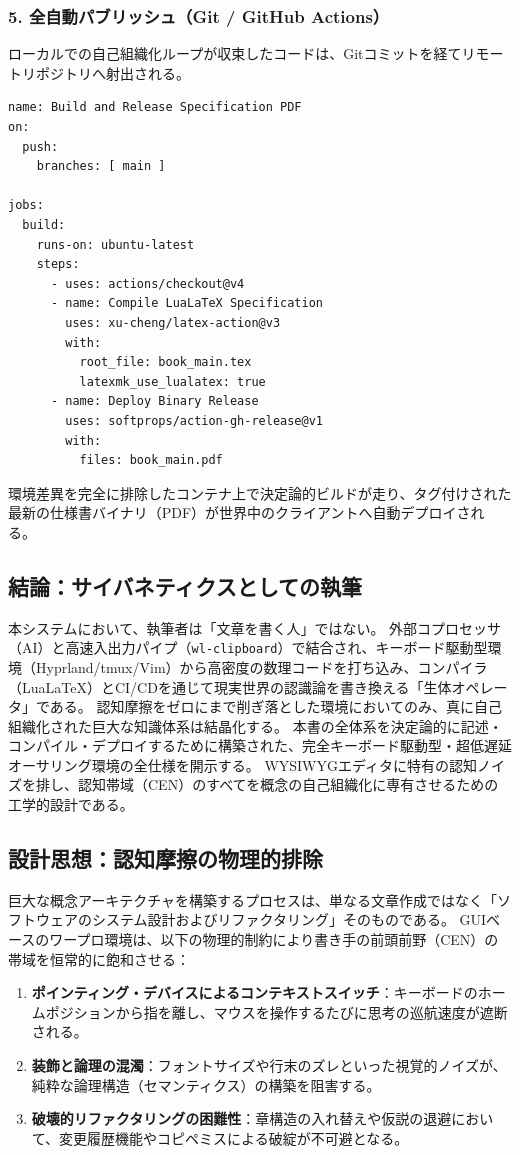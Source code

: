 \subsubsection{5. 全自動パブリッシュ（Git / GitHub Actions）}
ローカルでの自己組織化ループが収束したコードは、Gitコミットを経てリモートリポジトリへ射出される。

\begin{verbatim}
name: Build and Release Specification PDF
on:
  push:
    branches: [ main ]

jobs:
  build:
    runs-on: ubuntu-latest
    steps:
      - uses: actions/checkout@v4
      - name: Compile LuaLaTeX Specification
        uses: xu-cheng/latex-action@v3
        with:
          root_file: book_main.tex
          latexmk_use_lualatex: true
      - name: Deploy Binary Release
        uses: softprops/action-gh-release@v1
        with:
          files: book_main.pdf
\end{verbatim}

環境差異を完全に排除したコンテナ上で決定論的ビルドが走り、タグ付けされた最新の仕様書バイナリ（PDF）が世界中のクライアントへ自動デプロイされる。

\subsection{結論：サイバネティクスとしての執筆}
本システムにおいて、執筆者は「文章を書く人」ではない。
外部コプロセッサ（AI）と高速入出力パイプ（\texttt{wl-clipboard}）で結合され、キーボード駆動型環境（Hyprland/tmux/Vim）から高密度の数理コードを打ち込み、コンパイラ（LuaLaTeX）とCI/CDを通じて現実世界の認識論を書き換える「生体オペレータ」である。
認知摩擦をゼロにまで削ぎ落とした環境においてのみ、真に自己組織化された巨大な知識体系は結晶化する。
本書の全体系を決定論的に記述・コンパイル・デプロイするために構築された、完全キーボード駆動型・超低遅延オーサリング環境の全仕様を開示する。
WYSIWYGエディタに特有の認知ノイズを排し、認知帯域（CEN）のすべてを概念の自己組織化に専有させるための工学的設計である。

\subsection{設計思想：認知摩擦の物理的排除}
巨大な概念アーキテクチャを構築するプロセスは、単なる文章作成ではなく「ソフトウェアのシステム設計およびリファクタリング」そのものである。
GUIベースのワープロ環境は、以下の物理的制約により書き手の前頭前野（CEN）の帯域を恒常的に飽和させる：
\begin{enumerate}
    \item \textbf{ポインティング・デバイスによるコンテキストスイッチ}：キーボードのホームポジションから指を離し、マウスを操作するたびに思考の巡航速度が遮断される。
    \item \textbf{装飾と論理の混濁}：フォントサイズや行末のズレといった視覚的ノイズが、純粋な論理構造（セマンティクス）の構築を阻害する。
    \item \textbf{破壊的リファクタリングの困難性}：章構造の入れ替えや仮説の退避において、変更履歴機能やコピペミスによる破綻が不可避となる。
\end{enumerate}

